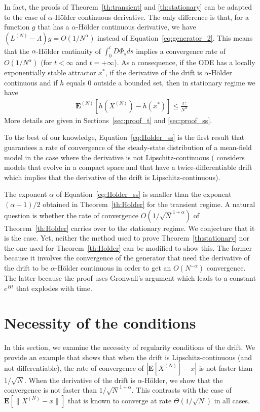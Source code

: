\documentclass[sigconf]{acmart}
\newcommand\XN{X^{(N)}}
\newcommand\LN{L^{(N)}}
\newcommand\sesp[1]{\mathbf{E}[#1]}
\newcommand\espN[1]{\mathbf{E}^{(N)}\left[#1\right]}
\newcommand\snorm[1]{\|#1\|}
\begin{document}
In fact, the proofs of Theorem~\ref{th:transient} and
\ref{th:stationary} can be adapted to the case of $\alpha$-Hölder
continuous derivative. The only difference is that, for a function $g$
that has a $\alpha$-Hölder continuous derivative, we have
$(\LN-\Lambda)g=O(1/N^\alpha)$ instead of
Equation~\eqref{eq:generator_2}. This means that the $\alpha$-Hölder
continuity of $\int_0^tD\Phi_sds$ implies a convergence rate of
$O(1/N^\alpha)$ (for $t<\infty$ and $t=+\infty$). As a consequence, if
the ODE has a locally exponentially stable attractor $x^*$, if the
derivative of the drift is $\alpha$-Hölder continuous and if $h$
equals $0$ outside a bounded set, then in stationary regime we have
\begin{align}
  \label{eq:Holder_ss}
  \espN{h(\XN)-h(x^*)} \le \frac{C}{N^\alpha}
\end{align}
More details are given in Sections~\ref{sec:proof_t} and
\ref{sec:proof_ss}.

To the best of our knowledge, Equation~\eqref{eq:Holder_ss} is the
first result that guarantees a rate of convergence of the steady-state
distribution of a mean-field model in the case where the derivative is
not Lipschitz-continuous (\cite{ying2016rate} considers models that
evolve in a compact space and that have a twice-differentiable drift
which implies that the derivative of the drift is
Lipschitz-continuous).

The exponent $\alpha$ of Equation~\eqref{eq:Holder_ss} is smaller than
the exponent $(\alpha+1)/2$ obtained in Theorem~\ref{th:Holder} for
the transient regime.  A natural question is whether the rate of
convergence $O(1/\sqrt{N}^{1+\alpha})$ of Theorem~\ref{th:Holder}
carries over to the stationary regime. We conjecture that it is the
case. 
Yet, neither the method used to prove Theorem~\ref{th:stationary} nor
the one used for Theorem~\ref{th:Holder} can be modified to show
this. The former because it involves the convergence of the generator
that need the derivative of the drift to be $\alpha$-Hölder continuous
in order to get an $O(N^{-\alpha})$ convergence. The latter because
the proof uses Gronwall's argument which leads to a constant $e^{Ht}$
that explodes with time.




\section{Necessity of the conditions}
\label{sec:numerical}

In this section, we examine the necessity of regularity conditions of
the drift. We provide an example that shows that when the drift is
Lipschitz-continuous (and not differentiable), the rate of convergence
of $|\sesp{\XN}-x|$ is not faster than $1/\sqrt{N}$. When the
derivative of the drift is $\alpha$-Hölder, we show that the
convergence is not faster than $1/\sqrt{N}^{1+\alpha}$.  This
contrasts with the case of $\sesp{\snorm{\XN-x}}$ that is known to
converge at rate $\Theta(1/\sqrt{N})$ in all cases.
\end{document}
